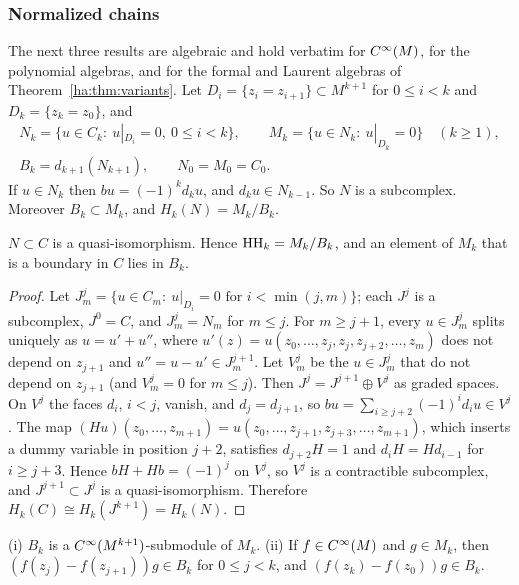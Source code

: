 \subsubsection*{Normalized chains}
The next three results are algebraic and hold verbatim for \(C^\infty(M)\), for
the polynomial algebras, and for the formal and Laurent algebras of
Theorem~\ref{ha:thm:variants}. Let \(D_i=\{z_i=z_{i+1}\}\subset M^{k+1}\)
for \(0\le i<k\) and \(D_k=\{z_k=z_0\}\), and
\begin{gather*}
 N_k=\{u\in C_k:\ u|_{D_i}=0,\ 0\le i<k\},\qquad M_k=\{u\in N_k:\
 u|_{D_k}=0\}\quad(k\ge1),\\
 B_k=d_{k+1}(N_{k+1}),\qquad N_0=M_0=C_0 .
\end{gather*}
If \(u\in N_k\) then \(bu=(-1)^kd_ku\), and \(d_ku\in N_{k-1}\). So \(N\) is
a subcomplex. Moreover \(B_k\subset M_k\), and \(H_k(N)=M_k/B_k\).

\begin{proposition}\label{ha:prop:normalized}
\(N\subset C\) is a quasi-isomorphism. Hence \(\operatorname{HH}_k=M_k/B_k\), and an
element of \(M_k\) that is a boundary in \(C\) lies in \(B_k\).
\end{proposition}

\begin{proof}
Let \(J^j_m=\{u\in C_m:\ u|_{D_i}=0\text{ for }i<\min(j,m)\}\); each
\(J^j\) is a subcomplex, \(J^0=C\), and \(J^j_m=N_m\) for \(m\le j\). For
\(m\ge j+1\), every \(u\in J^j_m\) splits uniquely as \(u=u'+u''\), where
\(u'(z)=u(z_0,\dots,z_j,z_j,z_{j+2},\dots,z_m)\) does not depend on
\(z_{j+1}\) and \(u''=u-u'\in J^{j+1}_m\). Let \(V^j_m\) be the
\(u\in J^j_m\) that do not depend on \(z_{j+1}\) (and \(V^j_m=0\) for
\(m\le j\)). Then \(J^j=J^{j+1}\oplus V^j\) as graded spaces. On \(V^j\)
the faces \(d_i\), \(i<j\), vanish, and \(d_j=d_{j+1}\), so
\(bu=\sum_{i\ge j+2}(-1)^id_iu\in V^j\). The map
\((Hu)(z_0,\dots,z_{m+1})=u(z_0,\dots,z_{j+1},z_{j+3},\dots,z_{m+1})\),
which inserts a dummy variable in position \(j+2\), satisfies
\(d_{j+2}H=1\) and \(d_iH=Hd_{i-1}\) for \(i\ge j+3\). Hence
\(bH+Hb=(-1)^j\) on \(V^j\), so \(V^j\) is a contractible subcomplex, and
\(J^{j+1}\subset J^j\) is a quasi-isomorphism. Therefore \(H_k(C)\cong
H_k(J^{k+1})=H_k(N)\).
\end{proof}

\begin{lemma}\label{ha:lem:Bmodule}
\textup{(i)} \(B_k\) is a \(C^\infty(M^{k+1})\)-submodule of \(M_k\).
\textup{(ii)} If \(f\in C^\infty(M)\) and \(g\in M_k\), then
\((f(z_j)-f(z_{j+1}))g\in B_k\) for \(0\le j<k\), and
\((f(z_k)-f(z_0))g\in B_k\).
\end{lemma}

